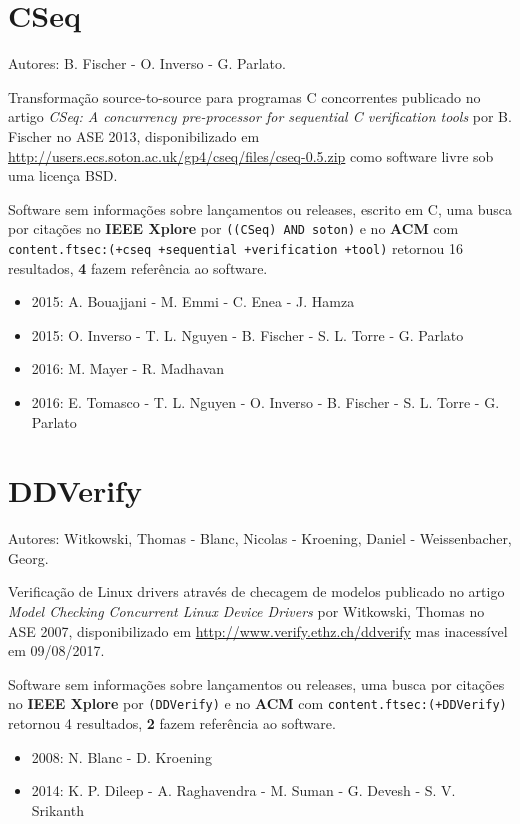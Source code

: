 \section{CSeq}

Autores:
B. Fischer - O. Inverso - G. Parlato.

Transformação source-to-source para programas C concorrentes
publicado no artigo {\it CSeq: A concurrency pre-processor for sequential C verification tools}
por B. Fischer
no ASE 2013,
disponibilizado em \url{http://users.ecs.soton.ac.uk/gp4/cseq/files/cseq-0.5.zip}
como software livre
sob uma licença BSD.

Software sem informações sobre lançamentos ou releases,
escrito em C,
uma busca por citações no {\bf IEEE Xplore} por
\texttt{((CSeq) AND soton)}
e no {\bf ACM} com
\texttt{content.ftsec:(+cseq +sequential +verification +tool)}
retornou
16 resultados,
{\bf 4} fazem referência ao software.

\begin{itemize}
\item 2015: A. Bouajjani - M. Emmi - C. Enea - J. Hamza
\item 2015: O. Inverso - T. L. Nguyen - B. Fischer - S. L. Torre - G. Parlato
\item 2016: M. Mayer - R. Madhavan
\item 2016: E. Tomasco - T. L. Nguyen - O. Inverso - B. Fischer - S. L. Torre - G. Parlato
\end{itemize}

\section{DDVerify}

Autores:
Witkowski, Thomas - Blanc, Nicolas - Kroening, Daniel - Weissenbacher, Georg.

Verificação de Linux drivers através de checagem de modelos
publicado no artigo {\it Model Checking Concurrent Linux Device Drivers}
por Witkowski, Thomas
no ASE 2007,
disponibilizado em \url{http://www.verify.ethz.ch/ddverify}
mas inacessível em 09/08/2017.

Software sem informações sobre lançamentos ou releases,
uma busca por citações no {\bf IEEE Xplore} por
\texttt{(DDVerify)}
e no {\bf ACM} com
\texttt{content.ftsec:(+DDVerify)}
retornou
4 resultados,
{\bf 2} fazem referência ao software.

\begin{itemize}
\item 2008: N. Blanc - D. Kroening
\item 2014: K. P. Dileep - A. Raghavendra - M. Suman - G. Devesh - S. V. Srikanth
\end{itemize}

